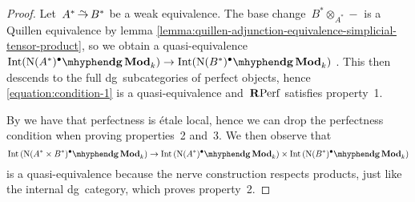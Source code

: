 \begin{refsection}
\begin{theorem}
\begin{proof}[Proof]
    Let~$A^*\weq B^*$ be a weak equivalence. The base change~$B^*\otimes_{A^*}-$ is a Quillen equivalence by lemma \ref{lemma:quillen-adjunction-equivalence-simplicial-tensor-product}, so we obtain a quasi-equivalence~$\Int(\dgMod{\nerve(A^*)^\bullet}_k)\to\Int(\dgMod{\nerve(B^*)^\bullet}_k)$ \cite[proposition 3.2]{toen-homotopy-theory-of-dg-categories}. This then descends to the full dg~subcategories of perfect objects, hence \eqref{equation:condition-1} is a quasi-equivalence and~$\mathbf{R}\mathrm{Perf}$ satisfies property~1.

    By \cite[corollary 1.3.7.4]{toen-vezzosi-hag-II} we have that perfectness is \'etale local, hence we can drop the perfectness condition when proving properties~2 and~3. We then observe that
    \begin{equation}
      \Int\left( \dgMod{\nerve(A^*\times B^*)^\bullet}_k \right)\to\Int\left( \dgMod{\nerve(A^*)^\bullet}_k \right)\times\Int\left( \dgMod{\nerve(B^*)^\bullet}_k \right)
    \end{equation}
    is a quasi-equivalence because the nerve construction respects products, just like the internal dg~category, which proves property~2.


\end{proof}
\end{theorem}
\end{refsection}
